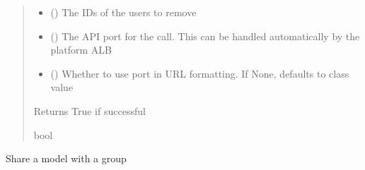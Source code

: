 \documentclass[letterpaper,10pt,english]{sphinxmanual}
\begin{document}
\begin{fulllineitems}
\begin{fulllineitems}
\begin{quote}
\begin{description}
\begin{itemize}
\item {} 
\sphinxAtStartPar
{} () \textendash{} The IDs of the users to remove

\item {} 
\sphinxAtStartPar
{} (\sphinxstyleliteralemphasis{\sphinxupquote{ (}}\sphinxstyleliteralemphasis{\sphinxupquote{)}}) \textendash{} The API port for the call. This can be handled automatically by the platform ALB

\item {} 
\sphinxAtStartPar
{} (\sphinxstyleliteralemphasis{\sphinxupquote{ (}}\sphinxstyleliteralemphasis{\sphinxupquote{)}}) \textendash{} Whether to use port in URL formatting. If None, defaults to class value

\end{itemize}

\sphinxAtStartPar
{} \textendash{} Returns True if successful

\sphinxAtStartPar
bool

\end{description}\end{quote}

\end{fulllineitems}


\begin{fulllineitems}
\label{\detokenize{aisquared.platform:aisquared.platform.AISquaredPlatformClient.AISquaredPlatformClient.share_model_with_group}}
\pysigstartsignatures
{}
\pysigstopsignatures
\sphinxAtStartPar
Share a model with a group


\end{fulllineitems}
\end{fulllineitems}
\end{document}
